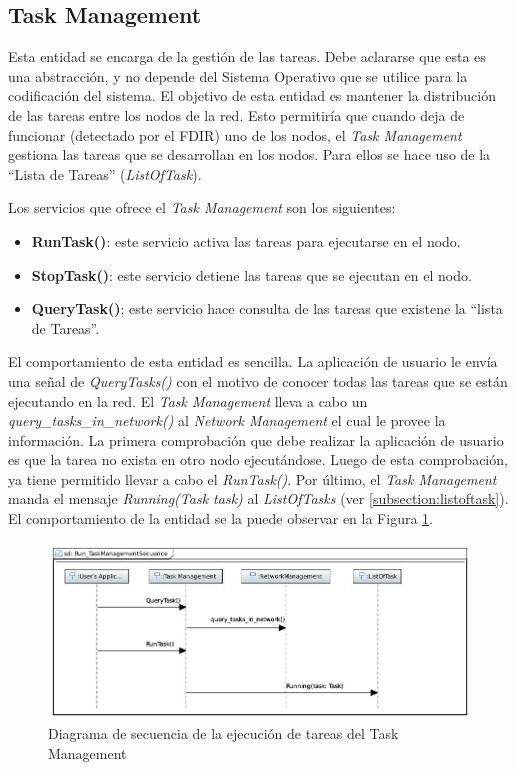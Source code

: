 \subsection{Task Management}
Esta entidad se encarga de la gestión de las tareas. Debe aclararse que esta es
una abstracción, y no depende del Sistema Operativo que se utilice para la
codificación del sistema. El objetivo de esta entidad es mantener la
distribución de las tareas entre los nodos de la red. Esto permitiría que cuando
deja de funcionar (detectado por el \ac{FDIR}) uno de los nodos, el
\textit{Task Management} gestiona las tareas que se desarrollan en los nodos.
Para ellos se hace uso de la ``Lista de Tareas'' (\textit{ListOfTask}).
 
Los servicios que ofrece el \textit{Task Management} son los siguientes:
\begin{itemize}
\item \textbf{RunTask()}: este servicio activa las tareas para ejecutarse en
  el nodo.
\item \textbf{StopTask()}: este servicio detiene las tareas que se ejecutan en
  el nodo.
\item \textbf{QueryTask()}; este servicio hace consulta de las tareas que
  existene la ``lista de Tareas''.
\end{itemize}

El comportamiento de esta entidad es sencilla. La aplicación de usuario le envía
una señal de \textit{QueryTasks()} con el motivo de conocer todas las tareas que
se están ejecutando en la red. El \textit{Task Management} lleva a cabo un
\textit{query\_tasks\_in\_network()} al \textit{Network Management} el cual le
provee la información. La primera comprobación que debe realizar la
aplicación de usuario es que la tarea no exista en otro nodo ejecutándose. Luego
de esta comprobación, ya tiene permitido llevar a cabo el \textit{RunTask()}. Por
último, el \textit{Task Management} manda el mensaje \textit{Running(Task task)}
al \textit{ListOfTasks} (ver \ref{subsection:listoftask}). El comportamiento de
la entidad se la puede observar en la Figura \ref{fig:TaskManagement_RunTask}.

\begin{figure}[h!]
 \centering
 \includegraphics[scale=0.4]{images/Secciones/AppendixA/TaskManagement.JPG}
  \caption{Diagrama de secuencia de la ejecución de tareas del Task Management}
\label{fig:TaskManagement_RunTask}
\end{figure}

